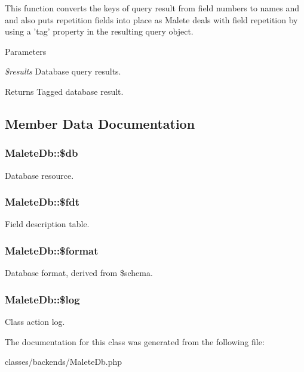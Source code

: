 This function converts the keys of query result from field numbers to names and and also puts repetition fields into place as Malete deals with field repetition by using a 'tag' property in the resulting query object.


\begin{DoxyParams}{Parameters}
\item[{\em \$results}]Database query results.\end{DoxyParams}
\begin{DoxyReturn}{Returns}
Tagged database result. 
\end{DoxyReturn}


\subsection{Member Data Documentation}
\hypertarget{classMaleteDb_a4b970df3631d2763f001c96ee417f27a}{
\subsubsection[{\$db}]{\setlength{\rightskip}{0pt plus 5cm}MaleteDb::\$db}}
\label{classMaleteDb_a4b970df3631d2763f001c96ee417f27a}
Database resource. \hypertarget{classMaleteDb_af2cd60ce81381edc3ca09a6812cf79fd}{
\subsubsection[{\$fdt}]{\setlength{\rightskip}{0pt plus 5cm}MaleteDb::\$fdt}}
\label{classMaleteDb_af2cd60ce81381edc3ca09a6812cf79fd}
Field description table. \hypertarget{classMaleteDb_a833fed4faae9537306053ee966c06197}{
\subsubsection[{\$format}]{\setlength{\rightskip}{0pt plus 5cm}MaleteDb::\$format}}
\label{classMaleteDb_a833fed4faae9537306053ee966c06197}
Database format, derived from \$schema. \hypertarget{classMaleteDb_ae1c8cefd1a6e661fb03c214f47336368}{
\subsubsection[{\$log}]{\setlength{\rightskip}{0pt plus 5cm}MaleteDb::\$log}}
\label{classMaleteDb_ae1c8cefd1a6e661fb03c214f47336368}
Class action log. 

The documentation for this class was generated from the following file:\begin{DoxyCompactItemize}
\item 
classes/backends/MaleteDb.php\end{DoxyCompactItemize}
